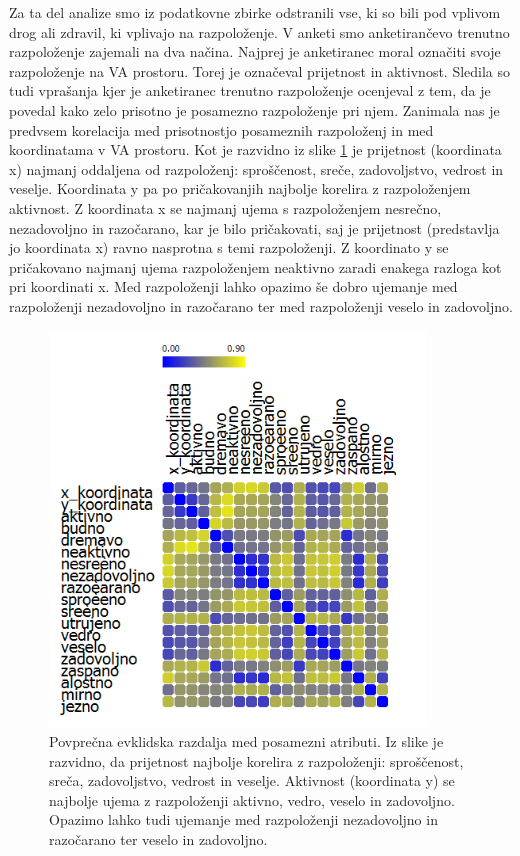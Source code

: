 \documentclass[a4paper, 12pt]{book}
\begin{document}
{Za ta del analize smo iz podatkovne zbirke odstranili vse, ki so bili pod vplivom drog ali zdravil, ki vplivajo na razpoloženje. V anketi smo anketirančevo trenutno razpoloženje zajemali na dva načina. Najprej je anketiranec moral označiti svoje razpoloženje na VA prostoru. Torej je označeval prijetnost in aktivnost. Sledila so tudi vprašanja kjer je anketiranec trenutno razpoloženje ocenjeval z tem, da je povedal kako zelo prisotno je posamezno razpoloženje pri njem. Zanimala nas je predvsem korelacija med prisotnostjo posameznih razpoloženj in med koordinatama v VA prostoru. Kot je razvidno iz slike \ref{prisotnost_kor} je prijetnost (koordinata x) najmanj oddaljena od razpoloženj: sproščenost, sreče, zadovoljstvo, vedrost in veselje. Koordinata y pa po pričakovanjih najbolje korelira z razpoloženjem aktivnost. Z koordinata x se najmanj ujema s razpoloženjem nesrečno, nezadovoljno in razočarano, kar je bilo pričakovati, saj je prijetnost (predstavlja jo koordinata x) ravno nasprotna s temi razpoloženji. Z koordinato y se pričakovano najmanj ujema razpoloženjem neaktivno zaradi enakega razloga kot pri koordinati x. Med razpoloženji lahko opazimo še dobro ujemanje med razpoloženji nezadovoljno in razočarano ter med razpoloženji veselo in zadovoljno. 

\begin{figure}[hbt]
\centering
\includegraphics[width=10cm]{images/korelacija.png}

\caption{Povprečna evklidska razdalja med posamezni atributi. Iz slike je razvidno, da prijetnost najbolje korelira z razpoloženji: sproščenost, sreča, zadovoljstvo, vedrost in veselje. Aktivnost (koordinata y) se najbolje ujema z razpoloženji aktivno, vedro, veselo in zadovoljno. Opazimo lahko tudi ujemanje med razpoloženji nezadovoljno in razočarano ter veselo in zadovoljno.}
\label{prisotnost_kor}
\end{figure}

}
\end{document}
